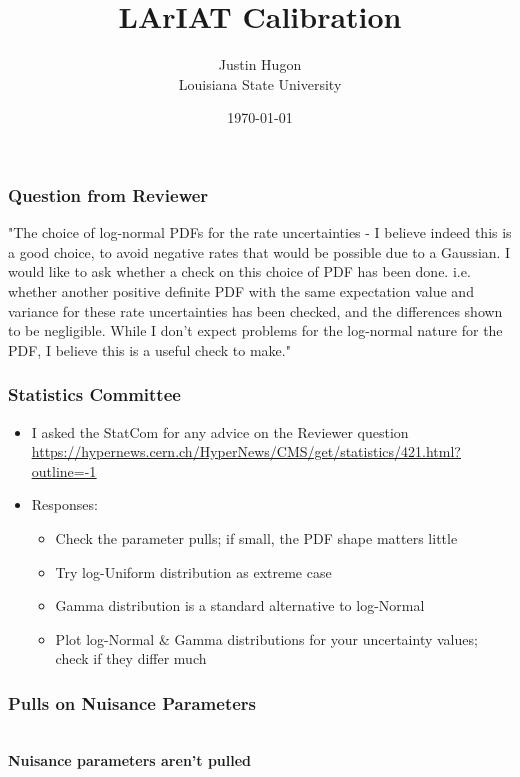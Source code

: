 \documentclass{hugontalk}
\title{LArIAT Calibration}
\date{\today}
\author{Justin Hugon \\ Louisiana State University}
\begin{document}
\hugontitlepage{\lariatlogos{}}


\begin{frame}
\frametitle{Question from Reviewer}
"The choice of log-normal PDFs for the rate uncertainties - I believe
indeed this is a good choice, to avoid negative rates that would be
possible due to a Gaussian. I would like to ask whether a check on this
choice of PDF has been done. i.e. whether another positive definite PDF
with the same expectation value and variance for these rate
uncertainties has been checked, and the differences shown to be
negligible. While I don't expect problems for the log-normal nature for
the PDF, I believe this is a useful check to make."
\end{frame}

\begin{frame}
\frametitle{Statistics Committee}
\begin{itemize}
  \item I asked the StatCom for any advice on the Reviewer question
        \textcolor{blue}{\tiny\underline{\url{https://hypernews.cern.ch/HyperNews/CMS/get/statistics/421.html?outline=-1}}}
  \item Responses:
  \begin{itemize}
    \item Check the parameter pulls; if small, the PDF shape matters little
    \item Try log-Uniform distribution as extreme case
    \item Gamma distribution is a standard alternative to log-Normal
    \item Plot log-Normal \& Gamma distributions for your uncertainty values; check if they differ much
  \end{itemize}
\end{itemize}
\begin{center}
\end{center}
\end{frame}

\begin{frame}
\frametitle{Pulls on Nuisance Parameters}
\begin{center}
        \\
        \vspace{1ex}
        \bf Nuisance parameters aren't pulled
\end{center}
\end{frame}
\end{document}
